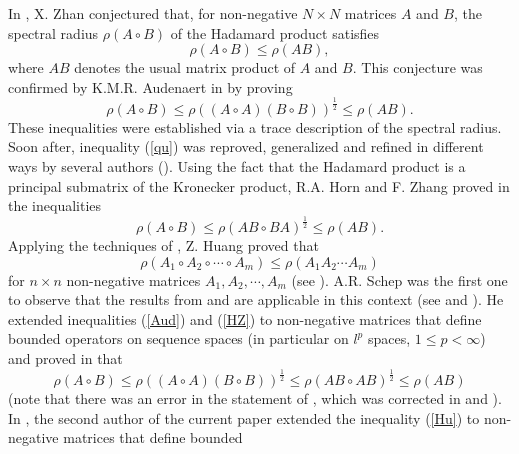 \documentclass[12pt, reqno]{amsart}
\theoremstyle{definition}
\theoremstyle{remark}
\numberwithin{equation}{section}
\newcommand{\be}{\begin{equation}}
\newcommand{\ee}{\end{equation}}
\begin{document}
In \cite{Zh09}, X. Zhan conjectured that, for non-negative $N\times N$ matrices $A$ and $B$, the spectral radius $\rho (A\circ B)$ of the Hadamard product satisfies
\be
\rho (A\circ B) \le \rho (AB),
\label{qu}
\ee
where $AB$ denotes the usual matrix product of $A$ and $B$. This conjecture was confirmed by K.M.R. Audenaert in \cite{Au10}
by proving
\be
\rho (A\circ B) \le \rho ((A\circ A)(B\circ B)) ^{\frac{1}{2}}\le \rho (AB).
\label{Aud}
\ee
These inequalities were established via a trace description of the spectral radius.
Soon after, inequality (\ref{qu}) was reproved, generalized and refined in different ways by
several authors (\cite{HZ10, Hu11, S11, Sc11, P12, CZ15, DP16, P17, P17+, BP21, BP22b, B23+}).
Using the fact that the Hadamard product is a principal submatrix of
the Kronecker product, R.A. Horn and F. Zhang  proved in \cite{HZ10} the inequalities
\be
\rho (A\circ B) \le \rho (AB\circ BA)^{\frac{1}{2}}\le \rho (AB).
\label{HZ}
\ee
Applying the techniques of \cite{HZ10}, Z.  Huang proved that
\be
\rho (A_1 \circ A_2 \circ \cdots \circ A_m) \le \rho (A_1 A_2 \cdots A_m)
\label{Hu}
\ee
for $n\times n$ non-negative matrices $A_1, A_2, \cdots, A_m$ (see \cite{Hu11}).  A.R. Schep was the first one to observe that the results from \cite{DP05} and \cite{P06} are applicable in this context (see \cite{S11} and \cite{Sc11}). He extended inequalities (\ref{Aud}) and (\ref{HZ}) to non-negative matrices that define bounded
operators on sequence spaces (in particular on $l^p$ spaces, $1\le p <\infty$) and proved in
\cite[Theorem 2.7]{S11}  that
\be
\rho (A\circ B) \le \rho ((A\circ A)(B\circ B))^{\frac{1}{2}}\le  \rho (AB\circ AB)^{\frac{1}{2}}\le \rho (AB)
\label{Sproved}
\ee
(note that there was an error in the statement of \cite[Theorem 2.7]{S11}, which was corrected in \cite{Sc11} and \cite{P12}).
In  \cite{P12}, the second author of the current paper extended the inequality (\ref{Hu}) to non-negative matrices that define bounded
\end{document}
